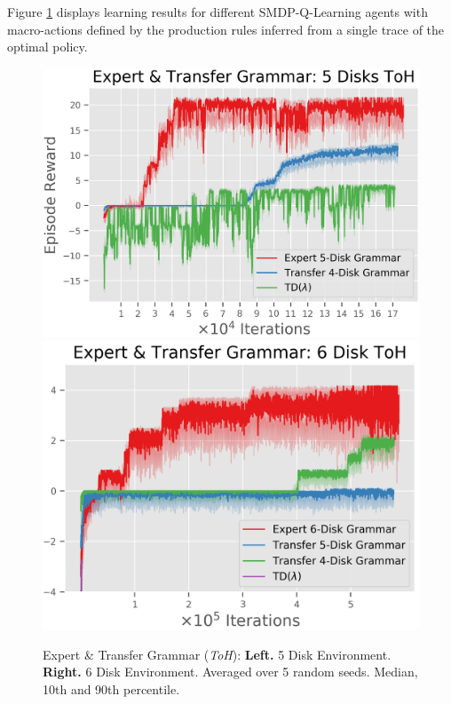 \documentclass[10pt,letterpaper]{article}
\begin{document}
Figure \ref{fig:expert_grammar_toh} displays learning results for different SMDP-Q-Learning agents with macro-actions defined by the production rules inferred from a single trace of the optimal policy. 
\begin{figure}[H]
  \includegraphics[width=\linewidth]{figures/hanoi_5_learning_curve}
\endminipage\hfill
{}
  \includegraphics[width=\linewidth]{figures/hanoi_6_learning_curve}
\endminipage\hfill
\caption{Expert \& Transfer Grammar (\textit{ToH}): \textbf{Left.} 5 Disk Environment. \textbf{Right.} 6 Disk Environment. Averaged over 5 random seeds. Median, 10th and 90th percentile.}
\label{fig:expert_grammar_toh}
\end{figure}
\end{document}
